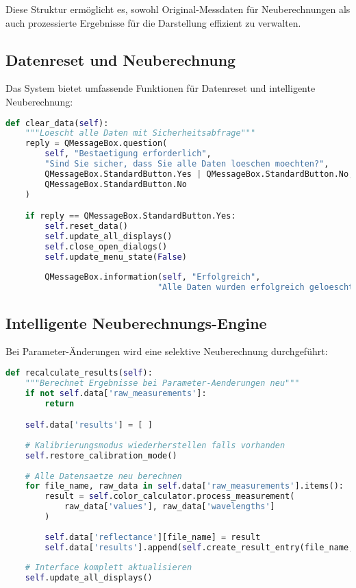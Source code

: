 Diese Struktur ermöglicht es, sowohl Original-Messdaten für Neuberechnungen als auch prozessierte Ergebnisse für die Darstellung effizient zu verwalten.

\subsection{Datenreset und Neuberechnung}

Das System bietet umfassende Funktionen für Datenreset und intelligente Neuberechnung:

\begin{lstlisting}[language=Python, caption=Sichere Datenreset-Funktion]
def clear_data(self):
    """Loescht alle Daten mit Sicherheitsabfrage"""
    reply = QMessageBox.question(
        self, "Bestaetigung erforderlich",
        "Sind Sie sicher, dass Sie alle Daten loeschen moechten?",
        QMessageBox.StandardButton.Yes | QMessageBox.StandardButton.No,
        QMessageBox.StandardButton.No
    )

    if reply == QMessageBox.StandardButton.Yes:
        self.reset_data()
        self.update_all_displays()
        self.close_open_dialogs()
        self.update_menu_state(False)
        
        QMessageBox.information(self, "Erfolgreich", 
                               "Alle Daten wurden erfolgreich geloescht.")
\end{lstlisting}

\subsection{Intelligente Neuberechnungs-Engine}

Bei Parameter-Änderungen wird eine selektive Neuberechnung durchgeführt:

\begin{lstlisting}[language=Python, caption=Parameter-abhängige Neuberechnung]
def recalculate_results(self):
    """Berechnet Ergebnisse bei Parameter-Aenderungen neu"""
    if not self.data['raw_measurements']:
        return

    self.data['results'] = [ ]
    
    # Kalibrierungsmodus wiederherstellen falls vorhanden
    self.restore_calibration_mode()
    
    # Alle Datensaetze neu berechnen
    for file_name, raw_data in self.data['raw_measurements'].items():
        result = self.color_calculator.process_measurement(
            raw_data['values'], raw_data['wavelengths']
        )
        
        self.data['reflectance'][file_name] = result
        self.data['results'].append(self.create_result_entry(file_name, result))
    
    # Interface komplett aktualisieren
    self.update_all_displays()
\end{lstlisting}

